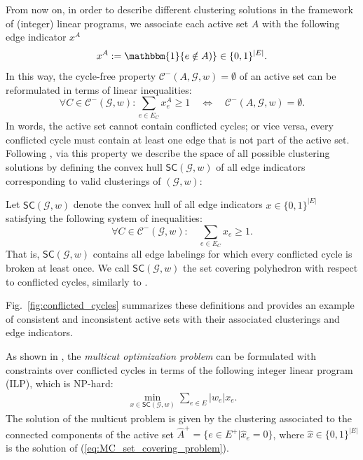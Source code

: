 \noindent 
From now on, in order to describe different clustering solutions in the framework of (integer) linear programs, we associate each active set $A$ with the following edge indicator $x^A$
\begin{equation}
         x^A := \mathbbm{1}\{e \notin A)\} \in \{0,1\}^{|E|}. \label{def:active_edge_indicator}
\end{equation}
In this way, the cycle-free property $\mathcal{C}^-(A, \mathcal{G},w)=\emptyset$ of an active set can be reformulated in terms of linear inequalities:
\begin{equation}
\forall C \in \mathcal{C}^-(\mathcal{G},w): \sum_{e\in E_C} x^A_e \geq 1 \quad \Longleftrightarrow \quad \mathcal{C}^-(A, \mathcal{G},w) = \emptyset. \label{eq:cycles_and_linear_ineq}
\end{equation}
In words, the active set cannot contain conflicted cycles; or vice versa, every conflicted cycle must contain at least one edge that is not part of the active set.
Following \cite{lange2018partial}, via this property we describe the space of all possible clustering solutions by defining the convex hull $\mathsf{SC}(\mathcal{G}, w)$ of all edge indicators corresponding to valid clusterings of $(\mathcal{G}, w)$:
\begin{definition}\label{def:set_covering_hull}
Let $\mathsf{SC}(\mathcal{G}, w)$ denote the convex hull of all edge indicators \mbox{$x \in \{0,1\}^{|E|}$} satisfying the following system of inequalities:
\begin{equation} 
\forall C \in \mathcal{C}^-(\mathcal{G},w): \quad \sum_{e\in E_C} x_e \geq 1. \label{eq:def_set_covering_hull}
\end{equation} 
That is, $\mathsf{SC}(\mathcal{G}, w)$ contains all edge labelings for which every conflicted cycle is broken at least once. We call $\mathsf{SC}(\mathcal{G}, w)$ the set covering polyhedron with respect to conflicted cycles, similarly to \cite{lange2018partial}.
\end{definition}


\noindent Fig.~\ref{fig:conflicted_cycles} summarizes these definitions and provides an example of consistent and inconsistent active sets with their associated clusterings and edge indicators.  

As shown in \cite{lange2018partial}, the \emph{multicut optimization problem} can be formulated with constraints over conflicted cycles in terms of the following integer linear program (ILP), which is NP-hard:
\begin{gather}
\min_{x \in \mathsf{SC}(\mathcal{G},w)} \sum_{e\in E} |w_e| x_e.
\label{eq:MC_set_covering_problem}
\end{gather}
The solution of the multicut problem is given by the clustering associated to the connected components of the active set $\hat{A}^+=\{e\in E^+|\hat{x}_e=0\}$, where \mbox{$\hat{x} \in \{0,1\}^{|E|}$} is the solution of (\ref{eq:MC_set_covering_problem}).

